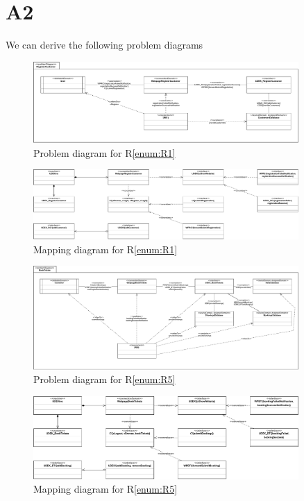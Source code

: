 \documentclass[a4paper,10pt,titlepage,bibtotoc,bibtotocnumbered]{scrreprt}
\begin{document}
\newpage\section{A2}
We can derive the following problem diagrams

\begin{figure}[H]
    \centering
    \includegraphics[width=0.9\textwidth]{figures/03/a03_problem_diagram_1-PD.pdf}
    \caption{Problem diagram for R\ref{enum:R1}}
    \label{figure:pdR1}
\end{figure}

\begin{figure}[H]
    \centering
    \includegraphics[width=0.9\textwidth]{figures/03/a03_problem_diagram_1-Mapping.pdf}
    \caption{Mapping diagram for R\ref{enum:R1}}
    \label{figure:mdR1}
\end{figure}

\begin{figure}[H]
    \centering
    \includegraphics[width=0.9\textwidth]{figures/03/a03_problem_diagram_3-PD.pdf}
    \caption{Problem diagram for R\ref{enum:R5}}
    \label{figure:pdR5}
\end{figure}

\begin{figure}[H]
    \centering
    \includegraphics[width=0.9\textwidth]{figures/03/a03_problem_diagram_3-Mapping.pdf}
    \caption{Mapping diagram for R\ref{enum:R5}}
    \label{figure:mdR5}
\end{figure}
\end{document}
